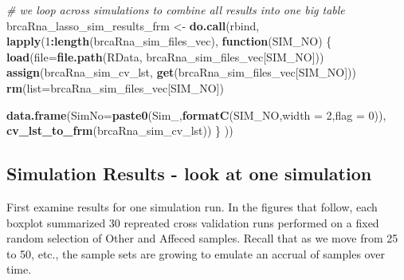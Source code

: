 \documentclass[
]{book}
\newenvironment{Shaded}{\begin{snugshade}}{\end{snugshade}}
\newcommand{\CommentTok}[1]{\textcolor[rgb]{0.56,0.35,0.01}{\textit{#1}}}
\newcommand{\ControlFlowTok}[1]{\textcolor[rgb]{0.13,0.29,0.53}{\textbf{#1}}}
\newcommand{\DataTypeTok}[1]{\textcolor[rgb]{0.13,0.29,0.53}{#1}}
\newcommand{\DecValTok}[1]{\textcolor[rgb]{0.00,0.00,0.81}{#1}}
\newcommand{\KeywordTok}[1]{\textcolor[rgb]{0.13,0.29,0.53}{\textbf{#1}}}
\newcommand{\NormalTok}[1]{#1}
\newcommand{\OperatorTok}[1]{\textcolor[rgb]{0.81,0.36,0.00}{\textbf{#1}}}
\newcommand{\StringTok}[1]{\textcolor[rgb]{0.31,0.60,0.02}{#1}}
\begin{document}
\begin{Shaded}
\begin{Highlighting}[]
\CommentTok{\# we loop across simulations to combine all results into one big table}
\NormalTok{brcaRna\_lasso\_sim\_results\_frm <{-}}\StringTok{ }\KeywordTok{do.call}\NormalTok{(}\StringTok{\textquotesingle{}rbind\textquotesingle{}}\NormalTok{, }\KeywordTok{lapply}\NormalTok{(}\DecValTok{1}\OperatorTok{:}\KeywordTok{length}\NormalTok{(brcaRna\_sim\_files\_vec),}
 \ControlFlowTok{function}\NormalTok{(SIM\_NO) \{}
  \KeywordTok{load}\NormalTok{(}\DataTypeTok{file=}\KeywordTok{file.path}\NormalTok{(}\StringTok{\textquotesingle{}RData\textquotesingle{}}\NormalTok{, brcaRna\_sim\_files\_vec[SIM\_NO]))}
  \KeywordTok{assign}\NormalTok{(}\StringTok{\textquotesingle{}brcaRna\_sim\_cv\_lst\textquotesingle{}}\NormalTok{, }\KeywordTok{get}\NormalTok{(brcaRna\_sim\_files\_vec[SIM\_NO]))}
  \KeywordTok{rm}\NormalTok{(}\DataTypeTok{list=}\NormalTok{brcaRna\_sim\_files\_vec[SIM\_NO])}
  
  \KeywordTok{data.frame}\NormalTok{(}\DataTypeTok{SimNo=}\KeywordTok{paste0}\NormalTok{(}\StringTok{\textquotesingle{}Sim\_\textquotesingle{}}\NormalTok{,}\KeywordTok{formatC}\NormalTok{(SIM\_NO,}\DataTypeTok{width =} \DecValTok{2}\NormalTok{,}\DataTypeTok{flag =} \DecValTok{0}\NormalTok{)), }\KeywordTok{cv\_lst\_to\_frm}\NormalTok{(brcaRna\_sim\_cv\_lst))}
\NormalTok{\} }
\NormalTok{)) }
\end{Highlighting}
\end{Shaded}

\hypertarget{simulation-results---look-at-one-simulation-1}{%
\subsection{Simulation Results - look at one simulation}\label{simulation-results---look-at-one-simulation-1}}

First examine results for one simulation run. In the figures that follow,
each boxplot summarized 30 repreated cross validation runs performed on a
fixed random selection of Other and Affeced samples. Recall that as
we move from 25 to 50, etc., the sample sets are growing to emulate an
accrual of samples over time.
\end{document}

